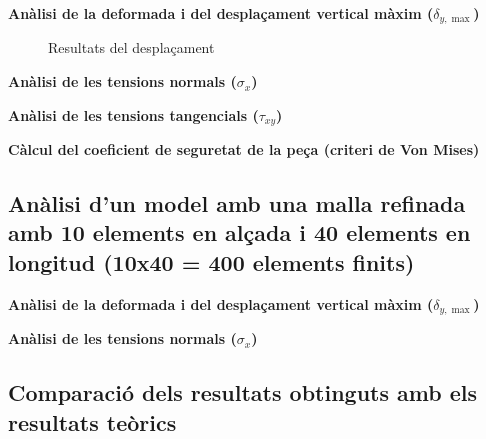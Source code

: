 \documentclass[a4paper]{article}
\begin{document}
\textbf{Anàlisi de la deformada i del desplaçament vertical màxim ($\delta_{y, \max}$)}

\begin{figure}[H]
	\label{fig:40_deformed}
	\hfill
	\label{fig:40_UY}
	\caption{Resultats del desplaçament}
	\label{fig:40_displacement}
\end{figure}

\textbf{Anàlisi de les tensions normals ($\sigma_x$)}

\textbf{Anàlisi de les tensions tangencials ($\tau_{xy}$)}

\textbf{Càlcul del coeficient de seguretat de la peça (criteri de Von Mises)}

\subsection{Anàlisi d'un model amb una malla refinada amb 10 elements en alçada i 40 elements en longitud (10x40 = 400 elements finits)}
\textbf{Anàlisi de la deformada i del desplaçament vertical màxim ($\delta_{y,\max}$)}

\textbf{Anàlisi de les tensions normals ($\sigma_x$)}

\subsection{Comparació dels resultats obtinguts amb els resultats teòrics}
\end{document}

